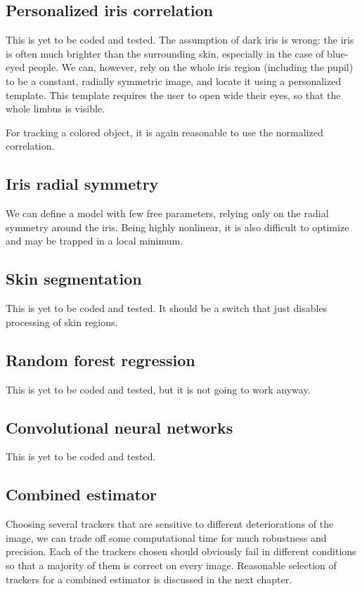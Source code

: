\subsection{Personalized iris correlation}
This is yet to be coded and tested.
The assumption of dark iris is wrong: the iris is often much brighter than the surrounding skin, especially in the case of blue-eyed people.
We can, however, rely on the whole iris region (including the pupil) to be a constant, radially symmetric image, and locate it using a personalized template.
This template requires the user to open wide their eyes, so that the whole limbus is visible.

For tracking a colored object, it is again reasonable to use the normalized correlation.

\subsection{Iris radial symmetry}
We can define a model with few free parameters, relying only on the radial symmetry around the iris.
Being highly nonlinear, it is also difficult to optimize and may be trapped in a local minimum.

\subsection{Skin segmentation}
This is yet to be coded and tested.
It should be a switch that just disables processing of skin regions.

\subsection{Random forest regression}
This is yet to be coded and tested, but it is not going to work anyway.

\subsection{Convolutional neural networks}
This is yet to be coded and tested.

\subsection{Combined estimator}

Choosing several trackers that are sensitive to different deteriorations of the image, we can trade off some computational time for much robustness and precision.
Each of the trackers chosen should obviously fail in different conditions so that a majority of them is correct on every image.
Reasonable selection of trackers for a combined estimator is discussed in the next chapter.

